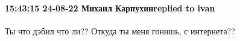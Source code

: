  
 
 
 
 

\paragraph{15:43:15 24-08-22 Михаил Карпухинreplied to ivan}

Ты что дэбил что ли?? Откуда ты меня гонишь, с интернета??
